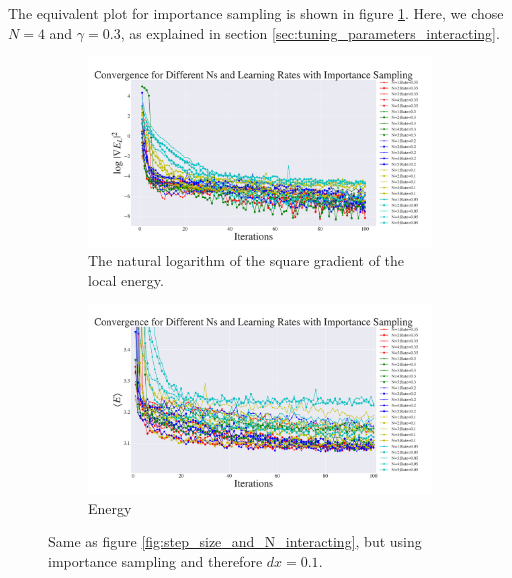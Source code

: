 \documentclass[a4paper, 10pt]{article}
\begin{document}
\linebreak
The equivalent plot for importance sampling is shown in figure \ref{fig:step_size_and_N_importance_interacting}. Here, we chose $N=4$ and $\gamma=0.3$, as explained in section \ref{sec:tuning_parameters_interacting}.\\
\begin{figure}[ht!]
	\centering
	\begin{subfigure}[t]{.9\textwidth}
		\centering
		\includegraphics[width=\textwidth]{../Results/grad_importance_interacting.pdf}
		\caption{The natural logarithm of the square gradient of the local energy.}
	\end{subfigure}%
	
	\begin{subfigure}[b]{.9\textwidth}
		\centering
		\includegraphics[width=\textwidth]{../Results/energy_importance_interacting.pdf}
		\caption{Energy}
	\end{subfigure}%
	\caption{Same as figure \ref{fig:step_size_and_N_interacting}, but using importance sampling and therefore $dx=0.1$.}\label{fig:step_size_and_N_importance_interacting}
\end{figure}\\
\end{document}
